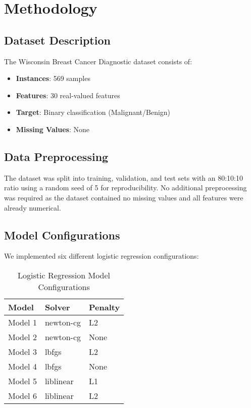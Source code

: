 \documentclass[12pt,a4paper]{article}
\begin{document}
\section{Methodology}

\subsection{Dataset Description}
The Wisconsin Breast Cancer Diagnostic dataset consists of:
\begin{itemize}
    \item \textbf{Instances}: 569 samples
    \item \textbf{Features}: 30 real-valued features
    \item \textbf{Target}: Binary classification (Malignant/Benign)
    \item \textbf{Missing Values}: None
\end{itemize}

\subsection{Data Preprocessing}
The dataset was split into training, validation, and test sets with an 80:10:10 ratio using a random seed of 5 for reproducibility. No additional preprocessing was required as the dataset contained no missing values and all features were already numerical.

\subsection{Model Configurations}
We implemented six different logistic regression configurations:

\begin{table}[H]
\centering
\caption{Logistic Regression Model Configurations}
\begin{tabular}{|l|l|l|}
\hline
\textbf{Model} & \textbf{Solver} & \textbf{Penalty} \\
\hline
Model 1 & newton-cg & L2 \\
Model 2 & newton-cg & None \\
Model 3 & lbfgs & L2 \\
Model 4 & lbfgs & None \\
Model 5 & liblinear & L1 \\
Model 6 & liblinear & L2 \\
\hline
\end{tabular}
\end{table}
\end{document}
